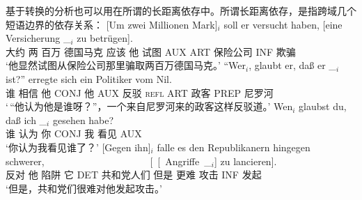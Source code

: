 基于转换的分析也可以用在所谓的长距离依存中。所谓长距离依存，是指跨域几个短语边界的依存关系：
\eal
\label{bsp-Fernabhaengigkeit}
\ex\label{bsp-um-zwei-millionen}
\gll {}[Um zwei Millionen Mark]$_i$ soll er versucht haben, [eine Versicherung \_$_i$ zu betrügen].\footnotemark\\
     {}\spacebr{}大约 两 百万 德国马克 应该 他 试图 AUX \spacebr{}ART 保险公司 {} INF 欺骗\\
\glt `他显然试图从保险公司那里骗取两百万德国马克。'
\ex
\gll "`Wer$_i$, glaubt er, daß er \_$_i$ ist?"' erregte sich ein Politiker vom Nil.\footnotemark\\
     \spacebr{}谁 相信 他 CONJ 他 {} AUX 反驳 \textsc{refl} ART 政客 PREP 尼罗河\\
\glt `\,``他认为他是谁呀？''，一个来自尼罗河来的政客这样反驳道。'
\ex\label{ex-wen-glaubst-du-dass}
\gll Wen$_i$ glaubst du, daß ich \_$_i$ gesehen habe?\footnotemark\\
     谁 认为 你 CONJ 我 {} 看见 AUX\\
\glt `你认为我看见谁了？'
\ex 
\gll {}[Gegen ihn]$_i$ falle es den Republikanern hingegen schwerer,~~~~~~~~~~~~~~~~~~~~~ [~[~Angriffe~\_$_i$] zu lancieren].\footnotemark\\
	 {}\spacebr{}反对 他 陷阱 它 DET 共和党人们 但是 更难 \hspaceThis{[~[~}攻击 INF 发起\\
\glt `但是，共和党们很难对他发起攻击。'
\zl
